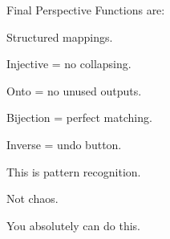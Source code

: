 \documentclass[aspectratio=169]{beamer}
\begin{document}
\begin{frame}{Final Perspective}
Functions are:

Structured mappings.

Injective = no collapsing.

Onto = no unused outputs.

Bijection = perfect matching.

Inverse = undo button.

This is pattern recognition.

Not chaos.

You absolutely can do this.
\end{frame}
\end{document}
